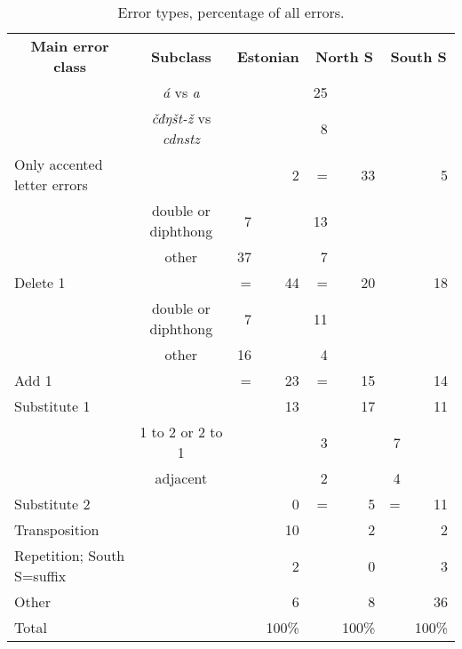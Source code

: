 \documentclass{flammie}
\newcommand{\samit}{\mbox{t\hspace{-.35em}-}} %
\begin{document}
\begin{table}[]
    \centering
\begin{tabular}{ l c |r r|r r|r r }
    \toprule
    \multicolumn{1}{c}{\bfseries Main error class} &
    \multicolumn{1}{c}{\bfseries Subclass } &
    \multicolumn{2}{c}{\bfseries Estonian} &
    \multicolumn{2}{c}{\bfseries North S} &
    \multicolumn{2}{c}{\bfseries South S} \\
\cmidrule(lr){1-8}
                            &  \textit{á} vs \textit{a}      &    &    & 25 &    &   &     \\
                            & \textit{čđŋš\samit{}ž} vs \textit{cdnstz}   &    &    &  8 &    &   &     \\
Only accented letter errors	&                    &    &  2 &  = & 33 &   &   5 \\
\cmidrule(lr){1-8}
                            & double or diphthong&  7 &    & 13 &    &   &     \\
                            & other              & 37 &    &  7 &    &   &     \\
Delete 1	                    &                    &  = & 44 &  = & 20 &   &  18 \\
\cmidrule(lr){1-8}
                            & double or diphthong&  7 &    & 11 &    &   &     \\
                            & other              & 16 &    &  4 &    &   &     \\
Add 1                       &                    &  = & 23 &  = & 15 &   &  14 \\
\cmidrule(lr){1-8}
Substitute 1                &                    &    & 13 &    & 17 &   &  11 \\
\cmidrule(lr){1-8}
                            & 1 to 2 or 2 to 1   &    &    &  3 &    & 7 &     \\
                            & adjacent           &    &    &  2 &    & 4 &     \\
Substitute 2                &                    &    &  0 &  = &  5 & = &  11 \\
\cmidrule(lr){1-8}
Transposition               &                    &    & 10 &    &  2 &   &   2 \\
\cmidrule(lr){1-8}
Repetition; South S=suffix  &                    &    &  2 &    &  0 &   &   3 \\
\cmidrule(lr){1-8}
Other                       &                    &    &  6 &    &  8 &   &  36 \\
\bottomrule
Total                       &                    &    & 100\% & &100\%&  & 100\%\\
\bottomrule
\end{tabular}
    \caption{Error types, percentage of all errors.}
    \label{tab:error_classes}
\end{table}
\end{document}
